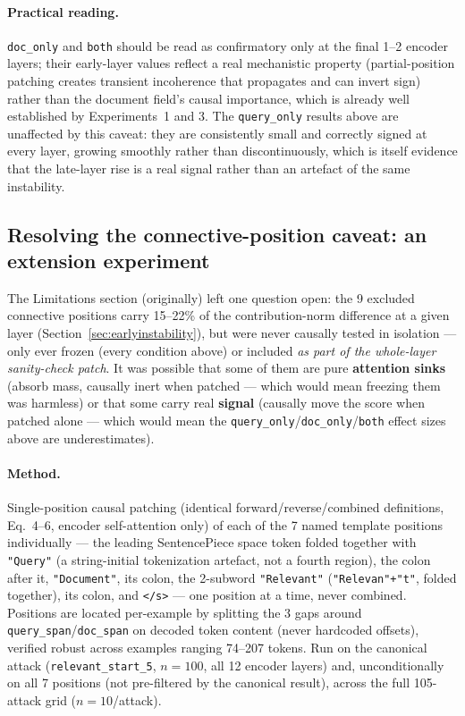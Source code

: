 \documentclass[11pt]{article}
\begin{document}
\paragraph{Practical reading.} \texttt{doc\_only} and \texttt{both} should
be read as confirmatory only at the final 1--2 encoder layers; their
early-layer values reflect a real mechanistic property (partial-position
patching creates transient incoherence that propagates and can invert
sign) rather than the document field's causal importance, which is already
well established by Experiments~1 and 3. The \texttt{query\_only} results
above are unaffected by this caveat: they are consistently small and
correctly signed at every layer, growing smoothly rather than
discontinuously, which is itself evidence that the late-layer rise is a
real signal rather than an artefact of the same instability.

\subsection{Resolving the connective-position caveat: an extension experiment}
\label{sec:template-extension}

The Limitations section (originally) left one question open: the 9 excluded
connective positions carry 15--22\% of the contribution-norm difference at a
given layer (Section~\ref{sec:earlyinstability}), but were never causally
tested in isolation — only ever frozen (every condition above) or included
\emph{as part of the whole-layer sanity-check patch}. It was possible that
some of them are pure \textbf{attention sinks} (absorb mass, causally inert
when patched — which would mean freezing them was harmless) or that some
carry real \textbf{signal} (causally move the score when patched alone —
which would mean the \texttt{query\_only}/\texttt{doc\_only}/\texttt{both}
effect sizes above are underestimates).

\paragraph{Method.} Single-position causal patching (identical
forward/reverse/combined definitions, Eq.~4--6, encoder self-attention only)
of each of the 7 named template positions individually — the leading
SentencePiece space token folded together with \texttt{"Query"} (a
string-initial tokenization artefact, not a fourth region), the colon after
it, \texttt{"Document"}, its colon, the 2-subword \texttt{"Relevant"}
(\texttt{"Relevan"+"t"}, folded together), its colon, and \texttt{</s>} —
one position at a time, never combined. Positions are located per-example by
splitting the 3 gaps around \texttt{query\_span}/\texttt{doc\_span} on
decoded token content (never hardcoded offsets), verified robust across
examples ranging 74--207 tokens. Run on the canonical attack
(\texttt{relevant\_start\_5}, $n{=}100$, all 12 encoder layers) and,
unconditionally on all 7 positions (not pre-filtered by the canonical
result), across the full 105-attack grid ($n{=}10$/attack).
\end{document}
